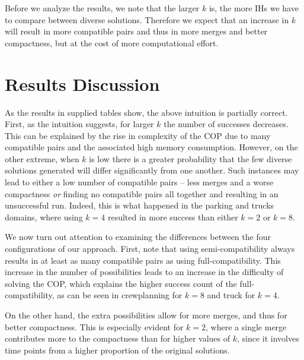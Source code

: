 

Before we analyze the results, we note that the larger $k$ is, the more IHs we have to compare between diverse solutions.
Therefore we expect that an increase in $k$ will result in more compatible pairs and thus in more merges and better compactness, but at the cost of more computational effort. 

\section{Results Discussion}
As the results in supplied tables show, the above intuition is partially correct. 
First, as the intuition suggests, for larger $k$ the number of successes decreases. This can be explained by the rise in complexity of the COP due to many compatible pairs and the associated high memory consumption.
However, on the other extreme, when $k$ is low there is a greater probability that the few diverse solutions generated will differ significantly from one another. Such instances may lead to either a low number of compatible pairs -- less merges and a worse compactness {\em or} finding no compatible pairs all together and resulting in an unsuccessful run. Indeed, this is what happened in the parking and trucks domains, where using $k=4$ resulted in more success than either $k=2$ or $k=8$.


We now turn out attention to examining the differences between the four configurations of our approach. First, note that using semi-compatibility always results in at least as many compatible pairs as using full-compatibility. 
This increase in the number of possibilities leads to an increase in the difficulty of solving the COP, which explains the higher success count of the full-compatibility, as can be seen in crewplanning for $k=8$ and truck for $k=4$.

On the other hand, the extra possibilities allow for more merges, and thus for better compactness. This is especially evident for $k=2$, where a single merge contributes more to the compactness than for higher values of $k$, since it involves time points from a higher proportion of the original solutions. 



